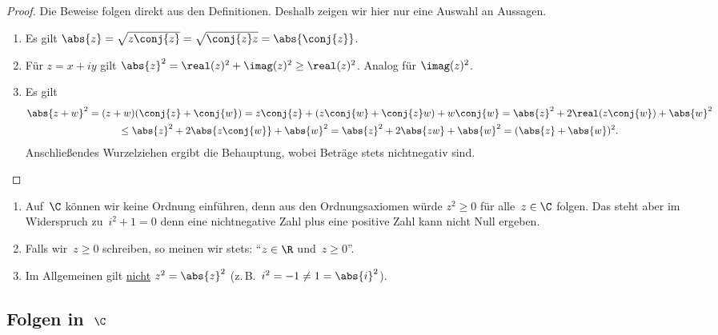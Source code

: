 \documentclass[a4paper]{article}
\begin{document}
\begin{proof}
    Die Beweise folgen direkt aus den Definitionen. Deshalb zeigen wir hier nur eine Auswahl an Aussagen.
    \begin{enumerate}[start=2]
        \item Es gilt $\abs{z} = \sqrt{z\conj{z}} = \sqrt{\conj{z}z} = \abs{\conj{z}}$.
        \item Für $z = x+iy$ gilt $\abs{z}^2 = \real(z)^2 + \imag(z)^2 \geq \real(z)^2$. Analog für $\imag(z)^2$.
        \item Es gilt
              \begin{multline*}
                  \abs{z+w}^2 = (z+w)(\conj{z}+\conj{w}) = z\conj{z} + (z\conj{w} + \conj{z}w) + w\conj{w} = \abs{z}^2 + 2\real(z\conj{w}) + \abs{w}^2 \\
                  \leq \abs{z}^2 + 2\abs{z\conj{w}} + \abs{w}^2 = \abs{z}^2 + 2\abs{zw} + \abs{w}^2 = (\abs{z}+\abs{w})^2.
              \end{multline*}
              Anschließendes Wurzelziehen ergibt die Behauptung, wobei Beträge stets nichtnegativ sind.\qedhere
    \end{enumerate}
\end{proof}


\begin{remark}\leavevmode
    \begin{enumerate}
        \item Auf~$\C$ können wir keine Ordnung einführen, denn aus den Ordnungsaxiomen würde $z^2 \geq 0$ für alle~$z \in \C$ folgen. Das steht aber im Widerspruch zu~$i^2+1 = 0$ denn eine nichtnegative Zahl plus eine positive Zahl kann nicht Null ergeben.
        \item Falls wir~$z \geq 0$ schreiben, so meinen wir stets: "`$z \in \R$ und~$z \geq 0$"'.
        \item Im Allgemeinen gilt \underline{nicht} $z^2 = \abs{z}^2$ (z.\,B.\ $i^2 = -1 \neq 1 = \abs{i}^2$).
    \end{enumerate}
\end{remark}

\subsection{Folgen in~\texorpdfstring{$\C$}{C}}
\end{document}
